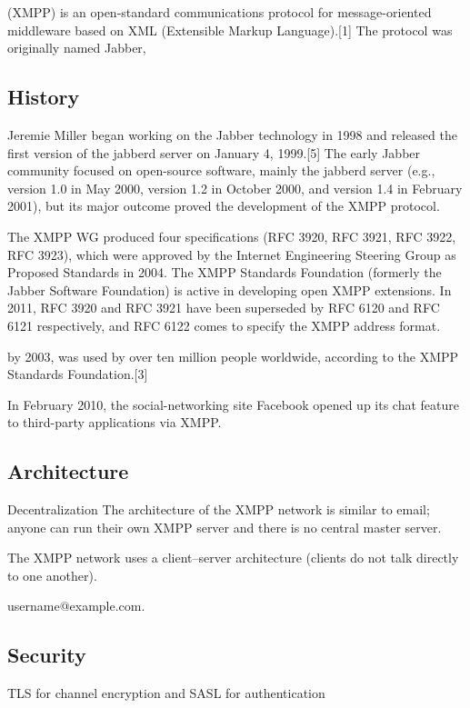 (XMPP) is an open-standard communications protocol for message-oriented middleware based on XML (Extensible Markup Language).[1] The protocol was originally named Jabber,



\subsection{History}
Jeremie Miller began working on the Jabber technology in 1998 and released the first version of the jabberd server on January 4, 1999.[5] The early Jabber community focused on open-source software, mainly the jabberd server (e.g., version 1.0 in May 2000, version 1.2 in October 2000, and version 1.4 in February 2001), but its major outcome proved the development of the XMPP protocol.

The XMPP WG produced four specifications (RFC 3920, RFC 3921, RFC 3922, RFC 3923), which were approved by the Internet Engineering Steering Group as Proposed Standards in 2004. The XMPP Standards Foundation (formerly the Jabber Software Foundation) is active in developing open XMPP extensions. In 2011, RFC 3920 and RFC 3921 have been superseded by RFC 6120 and RFC 6121 respectively, and RFC 6122 comes to specify the XMPP address format.

by 2003, was used by over ten million people worldwide, according to the XMPP Standards Foundation.[3]

In February 2010, the social-networking site Facebook opened up its chat feature to third-party applications via XMPP.

\subsection{Architecture}

Decentralization
The architecture of the XMPP network is similar to email; anyone can run their own XMPP server and there is no central master server.

The XMPP network uses a client–server architecture (clients do not talk directly to one another). 

username@example.com.
\subsection{Security}
TLS for channel encryption and SASL for authentication

